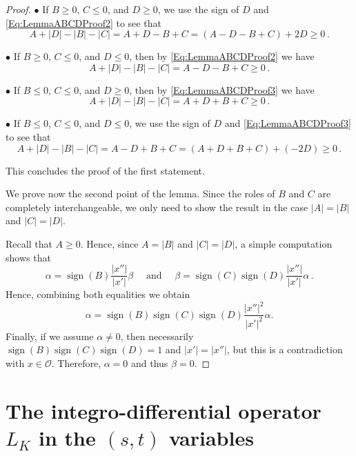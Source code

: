 \documentclass[12pt,reqno]{amsart}
\theoremstyle{definition}
\theoremstyle{remark}
\newcommand{\ocal}{\mathcal{O}}
\DeclareMathOperator{\sign}{sign}
\numberwithin{equation}{section}
\begin{document}
\begin{proof}
	$\bullet$ If $B \geq 0$, $C \leq 0$, and $D \geq 0$, we use the sign of $D$ and \eqref{Eq:LemmaABCDProof2} to see that
	$$
	A + |D| - |B| - |C| = A + D - B + C =  (A - D - B + C) + 2D \geq 0\,.
	$$
	
	$\bullet$ If $B \geq 0$, $C \leq 0$, and $D \leq 0$, then by \eqref{Eq:LemmaABCDProof2} we have
	$$
	A + |D| - |B| - |C| = A - D - B + C \geq 0\,.
	$$
	
	$\bullet$ If $B \leq 0$, $C \leq 0$, and $D \geq 0$, then by \eqref{Eq:LemmaABCDProof3} we have
	$$
	A + |D| - |B| - |C| = A + D + B + C \geq 0\,.
	$$
	
	$\bullet$ If $B \leq 0$, $C \leq 0$, and $D \leq 0$, we use the sign of $D$ and \eqref{Eq:LemmaABCDProof3} to see that
	$$
	A + |D| - |B| - |C| = A - D + B + C =  (A + D + B + C) + (-2D) \geq 0\,.
	$$
	
	This concludes the proof of the first statement.
	
	We prove now the second point of the lemma. Since the roles of $B$ and $C$ are completely interchangeable, we only need to show the result in the case $|A| = |B|$ and $|C| = |D|$.
	
	Recall that $A \geq 0$. Hence, since $A = |B|$ and $|C| = |D|$, a simple computation shows that
	$$
	\alpha = \sign (B) \dfrac{|x''|}{|x'|}\beta \quad \textrm{ and } \quad
	\beta = \sign (C) \sign(D) \dfrac{|x''|}{|x'|} \alpha \,.
	$$
	Hence, combining both equalities we obtain
	$$
	\alpha = \sign (B) \sign (C) \sign(D) \dfrac{|x''|^2}{|x'|^2} \alpha.
	$$
	Finally, if we assume $\alpha \neq 0$, then necessarily $\sign (B) \sign (C) \sign(D)=1$ and $|x'|= |x''|$, but this is a contradiction with $x\in \ocal$. Therefore, $\alpha = 0$ and thus $\beta =0$.
\end{proof}








\section{The integro-differential operator $L_K$ in the $(s,t)$ variables}
\label{Sec:stcomputations}
\end{document}
